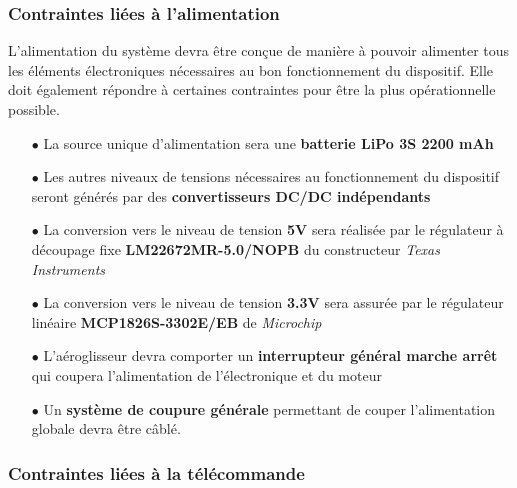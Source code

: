 \documentclass[a4paper,12pt]{report}
\begin{document}
			\vspace{-1em}
			
			\subsubsection{Contraintes liées à l'alimentation}
			
			\vspace{-1em}
			
			L'alimentation du système devra être conçue de manière à pouvoir alimenter tous les éléments électroniques nécessaires au bon fonctionnement du dispositif. Elle doit également répondre à certaines contraintes pour être la plus opérationnelle possible.
			
			\begin{itemize}
				\item[$\bullet$] La source unique d'alimentation sera une \textbf{batterie LiPo 3S 2200 mAh}
				\item[$\bullet$] Les autres niveaux de tensions nécessaires au fonctionnement du dispositif seront générés par des \textbf{convertisseurs DC/DC indépendants}
				\item[$\bullet$] La conversion vers le niveau de tension \textbf{5V} sera réalisée par le régulateur à découpage fixe \textbf{LM22672MR-5.0/NOPB} du constructeur \textit{Texas Instruments}
				\item[$\bullet$] La conversion vers le niveau de tension \textbf{3.3V} sera assurée par le régulateur linéaire \textbf{MCP1826S-3302E/EB} de \textit{Microchip}
				\item[$\bullet$] L'aéroglisseur devra comporter un \textbf{interrupteur général marche arrêt} qui coupera l'alimentation de l'électronique et du moteur
				\item[$\bullet$] Un \textbf{système de coupure générale} permettant de couper l'alimentation globale devra être câblé.
			\end{itemize}
			
			\vspace{-1em}
			
			\subsubsection{Contraintes liées à la télécommande}
			
			\vspace{-1em}
			
\end{document}
